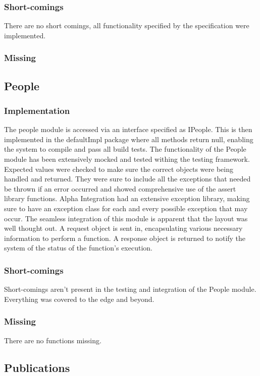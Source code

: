 \documentclass{article}
\begin{document}
        \subsubsection{Short-comings}
        There are no short comings, all functionality specified by the specification were implemented.
        \subsubsection{Missing}
        
    \subsection{People}
        \subsubsection{Implementation}
        The people module is accessed via an interface specified as IPeople. This is then implemented in the defaultImpl package where all methods return null, enabling the system to compile and pass all build tests. The functionality of the People module has been extensively mocked and tested withing the testing framework. Expected values were checked to make sure the correct objects were being handled and returned. They were sure to include all the exceptions that needed be thrown if an error occurred and showed comprehensive use of the assert library functions. Alpha Integration had an extensive exception library, making sure to have an exception class for each and every possible exception that may occur. The seamless integration of this module is apparent that the layout was well thought out. A request object is sent in, encapsulating various necessary information to perform a function. A response object is returned to notify the system of the status of the function's execution.
        \subsubsection{Short-comings}
        Short-comings aren't present in the testing and integration of the People module. Everything was covered to the edge and beyond.
        \subsubsection{Missing}
        There are no functions missing.
        
    \subsection{Publications}
\end{document}
